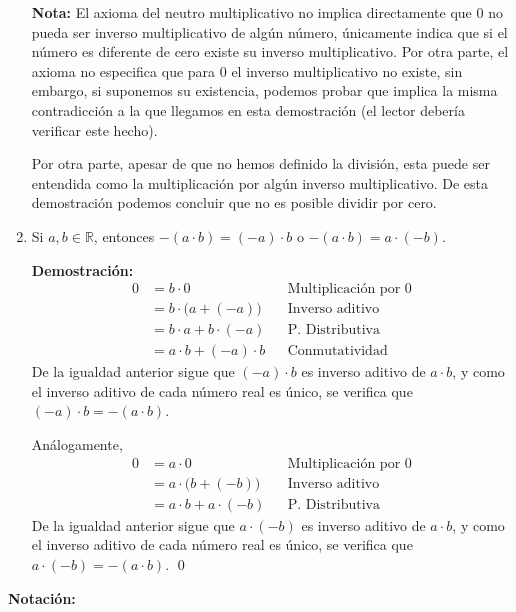 \documentclass[11pt]{article}
\newcommand{\R}{\mathbb{R}}
\begin{document}
\begin{enumerate}[label=\alph*)]
        \textbf{Nota:} El axioma del neutro multiplicativo no implica directamente que $0$ no pueda ser inverso multiplicativo de algún número, únicamente indica que si el número es diferente de cero existe su inverso multiplicativo. Por otra parte, el axioma no especifica que para 0 el inverso multiplicativo no existe, sin embargo, si suponemos su existencia, podemos probar que implica la misma contradicción a la que llegamos en esta demostración (el lector debería verificar este hecho).

        Por otra parte, apesar de que no hemos definido la división, esta puede ser entendida como la multiplicación por algún inverso multiplicativo. De esta demostración podemos concluir que no es posible dividir por cero.

        \item Si $a,b\in \R$, entonces $-(a\cdot b)=(-a)\cdot b$ o $-(a\cdot b)=a\cdot(-b)$.
        
        \textbf{Demostración:}
        \begin{align*}
            0 &= b\cdot 0 && \text{Multiplicación por $0$}\\
            &= b \cdot \bigl(a+(-a)\bigr) && \text{Inverso aditivo}\\
            &= b\cdot a + b\cdot (-a) && \text{P. Distributiva}\\
            &= a\cdot b + (-a) \cdot b && \text{Conmutatividad}
        \end{align*} De la igualdad anterior sigue que $(-a)\cdot b$ es inverso aditivo de $a\cdot b$, y como el inverso aditivo de cada número real es único, se verifica que $(-a)\cdot b = -(a\cdot b)$.
        
        Análogamente,
        \begin{align*}
            0 &= a\cdot 0 && \text{Multiplicación por $0$}\\
            &= a \cdot \bigl(b+(-b)\bigr) && \text{Inverso aditivo}\\
            &= a\cdot b + a\cdot (-b) && \text{P. Distributiva}
        \end{align*} De la igualdad anterior sigue que $a\cdot (-b)$ es inverso aditivo de $a\cdot b$, y como el inverso aditivo de cada número real es único, se verifica que $a\cdot (-b) = -(a\cdot b)$. \qed

    \end{enumerate}

\pagebreak

    \textbf{Notación:}
\end{document}
